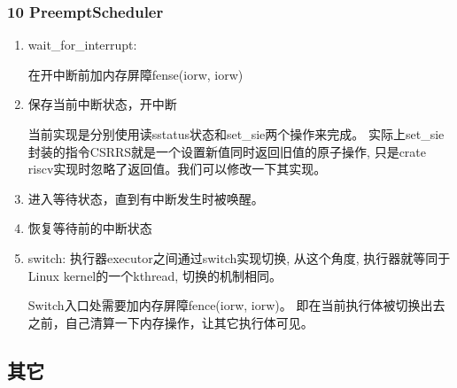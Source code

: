 \documentclass[
8pt, %
]{beamer}
\begin{document}
	\begin{frame}
		\frametitle{10 PreemptScheduler}
		\begin{enumerate}
			\item wait\_for\_interrupt:\\
			\begin{block}{}
				在开中断前加内存屏障fense(iorw, iorw)
			\end{block}
			\item 保存当前中断状态，开中断
			\begin{block}{}
				当前实现是分别使用读sstatus状态和set\_sie两个操作来完成。
				实际上set\_sie封装的指令CSRRS就是一个设置新值同时返回旧值的原子操作,
                只是crate riscv实现时忽略了返回值。我们可以修改一下其实现。
			\end{block}
			\item 进入等待状态，直到有中断发生时被唤醒。
			\item 恢复等待前的中断状态
			\item switch: 执行器executor之间通过switch实现切换, 从这个角度,
            执行器就等同于Linux kernel的一个kthread, 切换的机制相同。
			\begin{block}{}
				Switch入口处需要加内存屏障fence(iorw, iorw)。
				即在当前执行体被切换出去之前，自己清算一下内存操作，让其它执行体可见。
			\end{block}
		\end{enumerate}
	\end{frame}

	\subsection{其它}
\end{document}

